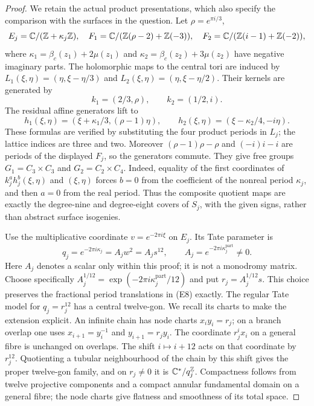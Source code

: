 \begin{proof}
We retain the actual product presentations, which also specify the
comparison with the surfaces in the question. Let
$\rho=e^{\pi i/3}$,
\[
 E_j=\mathbb C/(\mathbb Z+\kappa_j\mathbb Z),\quad
 F_1=\mathbb C/(\mathbb Z(\rho-2)+\mathbb Z(-3)),\quad
 F_2=\mathbb C/(\mathbb Z(i-1)+\mathbb Z(-2)),
\]
where $\kappa_1=\beta_c(z_1)+2\mu(z_1)$ and
$\kappa_2=\beta_c(z_2)+3\mu(z_2)$ have negative imaginary parts.
The holomorphic maps to the central tori are induced by
$L_1(\xi,\eta)=(\eta,\xi-\eta/3)$ and
$L_2(\xi,\eta)=(\eta,\xi-\eta/2)$. Their kernels are generated by
\[
 k_1=(2/3,\rho),\qquad k_2=(1/2,i).
\]
The residual affine generators lift to
\[
 h_1(\xi,\eta)=(\xi+\kappa_1/3,(\rho-1)\eta),\qquad
 h_2(\xi,\eta)=(\xi-\kappa_2/4,-i\eta).                     \tag{E8}
\]
These formulas are verified by substituting the four product periods
in $L_j$; the lattice indices are three and two. Moreover
$(\rho-1)\rho-\rho$ and $(-i)i-i$ are periods of the displayed
$F_j$, so the generators commute. They give free groups
$G_1=C_3\times C_3$ and $G_2=C_2\times C_4$. Indeed, equality of
the first coordinates of $k_j^a h_j^b(\xi,\eta)$ and $(\xi,\eta)$
forces $b=0$ from the coefficient of the nonreal period $\kappa_j$,
and then $a=0$ from the real period. Thus the composite quotient
maps are exactly the degree-nine and degree-eight covers of $S_j$,
with the given signs, rather than abstract surface isogenies.

Use the multiplicative coordinate $v=e^{-2\pi i\xi}$ on $E_j$.
Its Tate parameter is
\[
       q_j=e^{-2\pi i\kappa_j}=A_jw^2=A_js^{12},
       \qquad A_j=e^{-2\pi i\kappa_j^{\mathrm{part}}}\ne0.
\]
Here $A_j$ denotes a scalar only within this proof; it is not a
monodromy matrix. Choose specifically
$A_j^{1/12}=\exp(-2\pi i\kappa_j^{\mathrm{part}}/12)$ and put
$r_j=A_j^{1/12}s$. This choice preserves the fractional period
translations in (E8) exactly. The regular Tate model for $q_j=r_j^{12}$
has a central twelve-gon. We recall its charts to make the extension
explicit. An infinite chain has node charts
$x_i y_i=r_j$; on a branch overlap one uses
$x_{i+1}=y_i^{-1}$ and $y_{i+1}=r_jy_i$. The coordinate
$r_j^i x_i$ on a general fibre is unchanged on overlaps.
The shift $i\mapsto i+12$ acts on that coordinate by $r_j^{12}$.
Quotienting a tubular neighbourhood of the chain by this shift gives
the proper twelve-gon family, and on $r_j\ne0$ it is
$\mathbb C^*/q_j^\mathbb Z$. Compactness follows from twelve projective components
and a compact annular fundamental domain on a general fibre;
the node charts give flatness and smoothness of its total space.


\end{proof}
